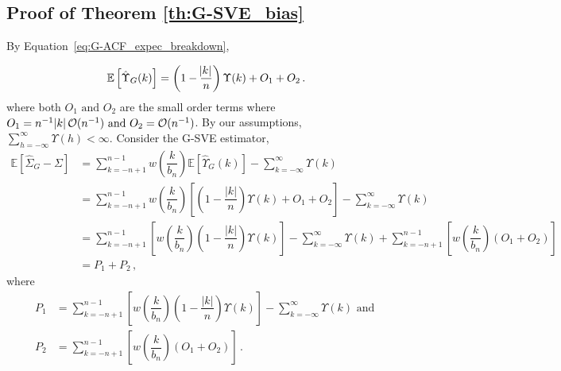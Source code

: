 \documentclass[11pt]{article}
\newcommand{\Var}{\text{Var}}
\newcommand\numberthis{\addtocounter{equation}{1}\tag{\theequation}}
\theoremstyle{remark}
\begin{document}
\subsection{Proof of Theorem \ref{th:G-SVE_bias}}

By Equation~\ref{eq:G-ACF_expec_breakdown},
%

\[
\mathbb{E} \left[\hat{\Upsilon}_{G}(k) \right] = \left(1 - \dfrac{\abs{k}}{n}\right)\Upsilon(k) + O_1 + O_2    \,.
\]
%
where both $O_1 \textrm{ and } O_2$ are the small order terms where $O_1 = n^{-1}\abs{k} \mathcal{O}(n^{-1}) \text{ and } O_2 = \mathcal{O}(n^{-1})$. By our assumptions, $\sum_{h=-\infty}^{\infty}\Upsilon(h) < \infty$.  
Consider the G-SVE estimator,
\begin{align*}
 \mathbb{E} \left[\hat{\Sigma}_{G} - \Sigma \right] & = \sum_{k=-n+1}^{n-1} w\left(\dfrac{k}{b_n}\right)\mathbb{E} \left[\hat{\Upsilon}_{G}(k) \right] - \sum_{k=-\infty}^{\infty}\Upsilon(k)\\
    &= \sum_{k=-n+1}^{n-1}  w\left(\dfrac{k}{b_n}\right)\left[\left(1-\dfrac{|k|}{n}\right)\Upsilon(k) + O_1 + O_2 \right]  - \sum_{k=-\infty}^{\infty}\Upsilon(k)\\
    &= \sum_{k=-n+1}^{n-1} \left[ w\left(\dfrac{k}{b_n}\right)\left(1-\dfrac{|k|}{n}\right)\Upsilon(k)\right]  - \sum_{k=-\infty}^{\infty}\Upsilon(k) + \sum_{k=-n+1}^{n-1}\left[  w\left(\dfrac{k}{b_n}\right)  (O_1 + O_2) \right] \\ 
    & = P_1 + P_2\,,
\end{align*}
%
where 
\begin{align*}
    P_1 &= \sum\limits_{k=-n+1}^{n-1}\left[w\left(\dfrac{k}{b_n}\right)\left(1-\dfrac{|k|}{n}\right)\Upsilon(k) \right] - \sum\limits_{k=-\infty}^{\infty}\Upsilon(k) \textrm{ and }\\   
    P_2 &= \sum_{k=-n+1}^{n-1}\left[  w\left(\dfrac{k }{b_n}\right)\left(O_1 + O_2\right)\right]\,.
\end{align*}
\end{document}
